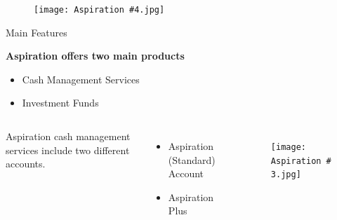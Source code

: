 \documentclass{beamer}
\begin{document}
\begin{frame}{}

\begin{itemize}

\begin{figure}[htp]
    \centering
    \texttt{[image: Aspiration \#4.jpg]}
    
\end{figure}
    


\end{itemize}
\end{frame}



\begin{frame}{Main Features}

\flushleft \textbf{ Aspiration offers two main products}
\vspace{4mm}
\begin{itemize}
    \item Cash Management Services 
    \item Investment Funds 
\end{itemize}

\end{frame}

\begin{frame}
\begin{columns}
 Aspiration cash management services include two different accounts.
 \begin{itemize}
    \item Aspiration (Standard) Account
    \item Aspiration Plus 
\end{itemize}

\begin{figure}[ht]
\begin{right}
\texttt{[image: Aspiration \# 3.jpg]}

\end{right}
\end{figure}
\end{columns}

\end{frame}
\end{document}
